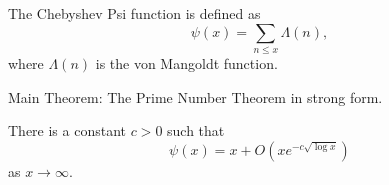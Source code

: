 
\begin{definition}\label{ChebyshevPsi}\leanok
The Chebyshev Psi function is defined as
$$
\psi(x) = \sum_{n \leq x} \Lambda(n),
$$
where $\Lambda(n)$ is the von Mangoldt function.
\end{definition}




Main Theorem: The Prime Number Theorem in strong form.
\begin{theorem}[PrimeNumberTheorem]\label{StrongPNT}
There is a constant $c > 0$ such that
$$
ψ (x) = x + O(x e^{-c \sqrt{\log x}})
$$
as $x\to \infty$.
\end{theorem}


